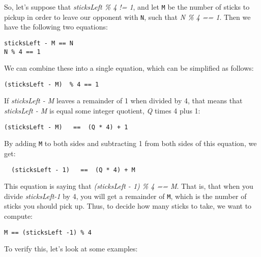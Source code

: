 So, let's suppose that {\it sticksLeft \% 4 != 1}, and let {\tt M} be
the number of sticks to pickup in order to leave our opponent with
{\tt N}, such that {\it N \% 4 == 1}. Then we have the following two
equations:

\begin{jjjlisting}
\begin{lstlisting}
sticksLeft - M == N    
N % 4 == 1
\end{lstlisting}
\end{jjjlisting}

\noindent We can combine these into a single equation, which can
be simplified as follows:

\begin{jjjlisting}
\begin{lstlisting}
(sticksLeft - M)  % 4 == 1
\end{lstlisting}
\end{jjjlisting}

\noindent If {\it sticksLeft - M} leaves a remainder of 1 when divided by
4, that means that {\it sticksLeft - M} is equal some integer quotient, {\it Q}
times 4 plus 1:

\begin{jjjlisting}
\begin{lstlisting}
(sticksLeft - M)   ==  (Q * 4) + 1
\end{lstlisting}
\end{jjjlisting}

\noindent By adding {\tt M} to both sides and subtracting 1 from both sides of
this equation, we get:

\begin{jjjlisting}
\begin{lstlisting}
  (sticksLeft - 1)   ==  (Q * 4) + M
\end{lstlisting}
\end{jjjlisting}

\noindent This equation is saying that {\it (sticksLeft - 1) \% 4 == M}. That is,
that when you divide {\it sticksLeft-1} by 4, you will get a remainder of {\tt M},
which is the number of sticks you should pick up.  Thus, to decide how  many 
sticks to take, we want to compute:

\begin{jjjlisting}
\begin{lstlisting}
M == (sticksLeft -1) % 4
\end{lstlisting}
\end{jjjlisting}

\noindent To verify this, let's look at some examples:

